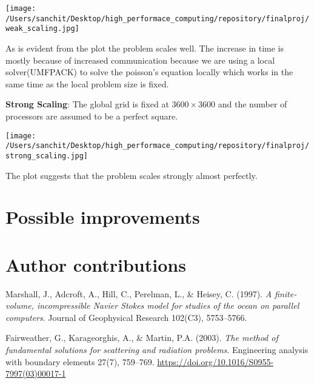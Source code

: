 \documentclass{article}
\begin{document}
	\texttt{[image: /Users/sanchit/Desktop/high\_performace\_computing/repository/finalproj/weak\_scaling.jpg]}
	
	As is evident from the plot the problem scales well. The increase in time is mostly because of increased communication because we are using a local solver(UMFPACK) to solve the poisson's equation locally which works in the same time as the local problem size is fixed.
	
	\textbf{Strong Scaling}: The global grid is fixed at $3600\times3600$ and the number of processors are assumed to be a perfect square.
	
		\texttt{[image: /Users/sanchit/Desktop/high\_performace\_computing/repository/finalproj/strong\_scaling.jpg]}

The plot suggests that the problem scales strongly almost perfectly. 
	\section{Possible improvements}
	
	\section{Author contributions}
	
	\begin{thebibliography}{9}
		Marshall, J., Adcroft, A., Hill, C., Perelman, L., \& Heisey, C.
		(1997).
		\emph{A finite-volume, incompressible Navier Stokes model for studies of the ocean on parallel computers}.
		Journal of Geophysical Research 
		102(C3), 5753--5766.
		
		Fairweather, G., Karageorghis, A., \& Martin, P.A.
		(2003).
		\emph{The method of fundamental solutions for scattering and radiation problems}.
		Engineering analysis with boundary elements   
		27(7), 759--769.
		\url{https://doi.org/10.1016/S0955-7997(03)00017-1}
		
	\end{thebibliography}
\end{document}
